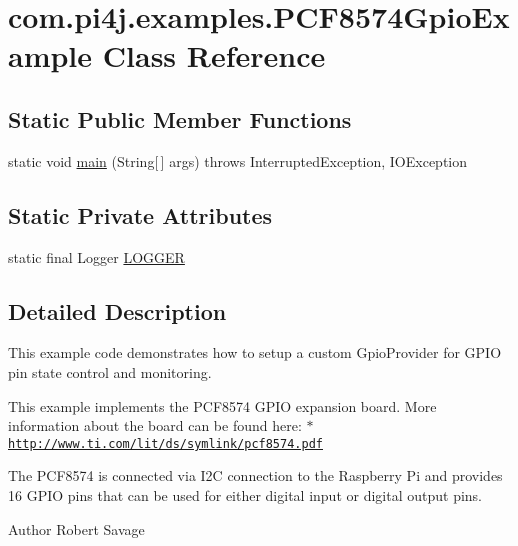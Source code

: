 \hypertarget{classcom_1_1pi4j_1_1examples_1_1PCF8574GpioExample}{}\section{com.\+pi4j.\+examples.\+P\+C\+F8574\+Gpio\+Example Class Reference}
\label{classcom_1_1pi4j_1_1examples_1_1PCF8574GpioExample}
\subsection*{Static Public Member Functions}
\begin{DoxyCompactItemize}
\item 
static void \hyperlink{classcom_1_1pi4j_1_1examples_1_1PCF8574GpioExample_a351d0ff2ea3c778804cb0e6cdde01080}{main} (String\mbox{[}$\,$\mbox{]} args)  throws Interrupted\+Exception,             I\+O\+Exception 
\end{DoxyCompactItemize}
\subsection*{Static Private Attributes}
\begin{DoxyCompactItemize}
\item 
static final Logger \hyperlink{classcom_1_1pi4j_1_1examples_1_1PCF8574GpioExample_aa4e6ba9830b9f5d38d577c4866d10335}{L\+O\+G\+G\+E\+R}
\end{DoxyCompactItemize}


\subsection{Detailed Description}
This example code demonstrates how to setup a custom Gpio\+Provider for G\+P\+I\+O pin state control and monitoring. 

This example implements the P\+C\+F8574 G\+P\+I\+O expansion board. More information about the board can be found here\+: $\ast$ \href{http://www.ti.com/lit/ds/symlink/pcf8574.pdf}{\tt http\+://www.\+ti.\+com/lit/ds/symlink/pcf8574.\+pdf} 

The P\+C\+F8574 is connected via I2\+C connection to the Raspberry Pi and provides 16 G\+P\+I\+O pins that can be used for either digital input or digital output pins. 

\begin{DoxyAuthor}{Author}
Robert Savage 
\end{DoxyAuthor}


